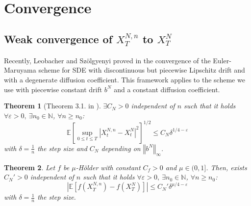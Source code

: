 \documentclass[12pt]{article}
\newtheorem{theo}{Theorem}
\newcommand{\norme}[1]{\left\Vert #1\right\Vert}
\newcommand{\N}{\mathbb{N}}
\newcommand{\E}{\mathbb{E}}
\begin{document}

\newpage
\section{Convergence} 
    
    \subsection{Weak convergence of $X_T^{N,n}$ to $X_T^N$}
            \paragraph{}
            Recently, Leobacher and Szölgyenyi proved in \cite{Leo-Szo} the convergence of the Euler-Maruyama scheme for SDE with discontinuous but piecewise Lipschitz drift and with a degenerate diffusion coefficient. This framework applies to the scheme we use with piecewise constant drift $b^N$ and a constant diffusion coefficient.
    
       \begin{theo}[Theorem 3.1. in \cite{Leo-Szo}]\label{leo}
           $\exists C_N>0$ independent of $n$ such that it holds  $\forall \varepsilon >0,\ \exists n_0\in\N$, $\forall n\geq n_0$:
           \begin{equation}
            \E\left[\underset{0\leq t\leq T}{\sup}\left|X^{N,n}_t-X^N_t\right|^2\right]^{1/2}\leq C_N\delta^{1/4-\varepsilon}
            \end{equation}
            with $\delta=\frac{1}{n}$ the step size and $C_N$ depending on $\norme{b^N}_\infty$.
        \end{theo}
    
        \begin{theo}
            Let $f$ be $\mu$-Hölder with constant $C_f>0$ and $\mu\in(0,1]$. Then, exists $C_N'>0$ independent of $n$ such that it holds  $\forall \varepsilon >0,\ \exists n_0\in\N$, $\forall n\geq n_0$:
            \begin{equation}
            \left|\E\left[f\left(X_T^{N,n}\right)-f\left(X_T^N\right)\right]\right| \leq C_N'\delta^{\mu/4-\varepsilon}
            \end{equation}                       
            with $\delta=\frac{1}{n}$ the step size.
        \end{theo}
    
\end{document}
